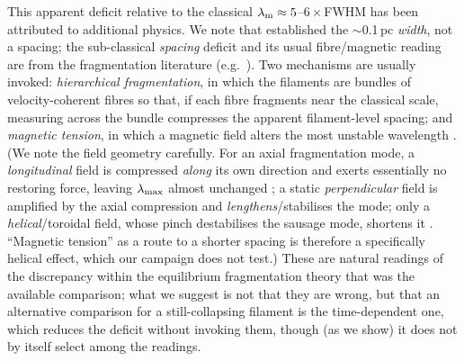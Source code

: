 \documentclass[usenatbib,twoside,twocolumn]{mnras}
\begin{document}
This apparent deficit relative to the classical $\lambda_{\rm m}\approx5$--$6\times$FWHM has been attributed to additional physics. We note that \citet{Arzoumanian2019} established the $\sim$0.1\,pc \emph{width}, not a spacing; the sub-classical \emph{spacing} deficit and its usual fibre/magnetic reading are from the fragmentation literature (e.g.\ \citealt{Fischera2012,Zhang2023cal}). Two mechanisms are usually invoked: \emph{hierarchical fragmentation}, in which the filaments are bundles of velocity-coherent fibres \citep{Hacar2013,Hacar2018,Yang2024} so that, if each fibre fragments near the classical scale, measuring across the bundle compresses the apparent filament-level spacing; and \emph{magnetic tension}, in which a magnetic field alters the most unstable wavelength \citep{Nakamura1993}. (We note the field geometry carefully. For an axial fragmentation mode, a \emph{longitudinal} field is compressed \emph{along} its own direction and exerts essentially no restoring force, leaving $\lambda_{\rm max}$ almost unchanged \citep[][consistent with our $\theta=0^\circ$ runs being nearly $\beta$-independent]{Nagasawa1987,Nakamura1993}; a static \emph{perpendicular} field is amplified by the axial compression and \emph{lengthens}/stabilises the mode; only a \emph{helical}/toroidal field, whose pinch destabilises the sausage mode, shortens it \citep{Fiege2000}. ``Magnetic tension'' as a route to a shorter spacing is therefore a specifically helical effect, which our campaign does not test.) These are natural readings of the discrepancy within the equilibrium fragmentation theory that was the available comparison; what we suggest is not that they are wrong, but that an alternative comparison for a still-collapsing filament is the time-dependent one, which reduces the deficit without invoking them, though (as we show) it does not by itself select among the readings.
\end{document}
